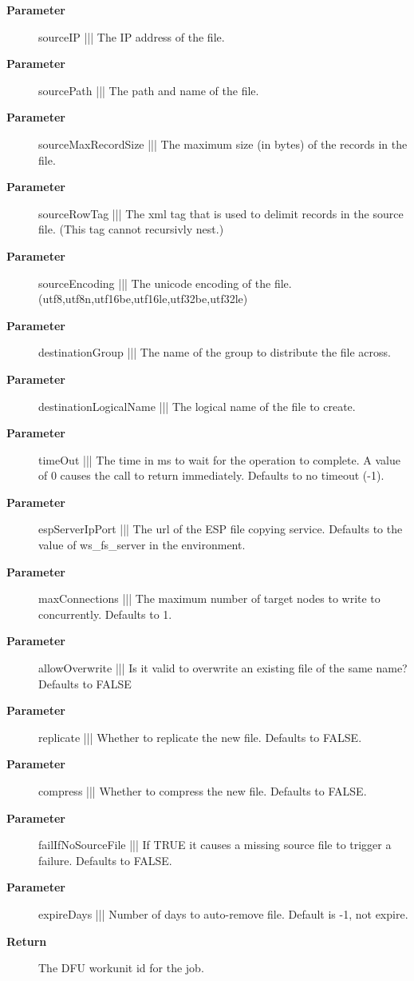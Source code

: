 \par
\begin{description}
\item [\textbf{Parameter}] sourceIP ||| The IP address of the file.
\item [\textbf{Parameter}] sourcePath ||| The path and name of the file.
\item [\textbf{Parameter}] sourceMaxRecordSize ||| The maximum size (in bytes) of the records in the file.
\item [\textbf{Parameter}] sourceRowTag ||| The xml tag that is used to delimit records in the source file. (This tag cannot recursivly nest.)
\item [\textbf{Parameter}] sourceEncoding ||| The unicode encoding of the file. (utf8,utf8n,utf16be,utf16le,utf32be,utf32le)
\item [\textbf{Parameter}] destinationGroup ||| The name of the group to distribute the file across.
\item [\textbf{Parameter}] destinationLogicalName ||| The logical name of the file to create.
\item [\textbf{Parameter}] timeOut ||| The time in ms to wait for the operation to complete. A value of 0 causes the call to return immediately. Defaults to no timeout (-1).
\item [\textbf{Parameter}] espServerIpPort ||| The url of the ESP file copying service. Defaults to the value of ws\_fs\_server in the environment.
\item [\textbf{Parameter}] maxConnections ||| The maximum number of target nodes to write to concurrently. Defaults to 1.
\item [\textbf{Parameter}] allowOverwrite ||| Is it valid to overwrite an existing file of the same name? Defaults to FALSE
\item [\textbf{Parameter}] replicate ||| Whether to replicate the new file. Defaults to FALSE.
\item [\textbf{Parameter}] compress ||| Whether to compress the new file. Defaults to FALSE.
\item [\textbf{Parameter}] failIfNoSourceFile ||| If TRUE it causes a missing source file to trigger a failure. Defaults to FALSE.
\item [\textbf{Parameter}] expireDays ||| Number of days to auto-remove file. Default is -1, not expire.
\item [\textbf{Return}] The DFU workunit id for the job.
\end{description}


